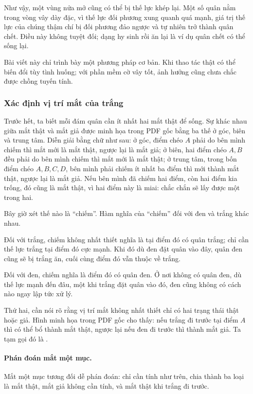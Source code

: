 \documentclass[11pt]{article}
\begin{document}
Như vậy, một vùng nửa mở cũng có thể bị thế lực khép lại. Một số quân nằm
trong vòng vây dày đặc, vì thế lực đối phương xung quanh quá mạnh, giá trị
thế lực của chúng thậm chí bị đối phương đảo ngược và tự nhiên trở thành
quân chết. Điều này không tuyệt đối; dạng hy sinh rồi ăn lại là ví dụ quân
chết có thể sống lại.

Bài viết này chỉ trình bày một phương pháp cơ bản. Khi thao tác thật có thể
biến đổi tùy tình huống; với phần mềm cờ vây tốt, ảnh hưởng cũng chưa chắc
được chồng tuyến tính.

\subsubsection{Xác định vị trí mắt của trắng}

Trước hết, ta biết mỗi đám quân cần ít nhất hai mắt thật để sống. Sự khác
nhau giữa mắt thật và mắt giả được minh họa trong PDF gốc bằng ba thế ở góc,
biên và trung tâm. Diễn giải bằng chữ như sau: ở góc, điểm chéo \(A\) phải
do bên mình chiếm thì mắt mới là mắt thật, ngược lại là mắt giả; ở biên, hai
điểm chéo \(A,B\) đều phải do bên mình chiếm thì mắt mới là mắt thật; ở trung
tâm, trong bốn điểm chéo \(A,B,C,D\), bên mình phải chiếm ít nhất ba điểm thì
mới thành mắt thật, ngược lại là mắt giả. Nếu bên mình đã chiếm hai điểm, còn
hai điểm kia trống, đó cũng là mắt thật, vì hai điểm này là miai: chắc chắn
sẽ lấy được một trong hai.

Bây giờ xét thế nào là ``chiếm''. Hàm nghĩa của ``chiếm'' đối với đen và
trắng khác nhau.

Đối với trắng, chiếm không nhất thiết nghĩa là tại điểm đó có quân trắng; chỉ
cần thế lực trắng tại điểm đó cực mạnh. Khi đó dù đen đặt quân vào đây, quân
đen cũng sẽ bị trắng ăn, cuối cùng điểm đó vẫn thuộc về trắng.

Đối với đen, chiếm nghĩa là điểm đó có quân đen. Ở nơi không có quân đen, dù
thế lực mạnh đến đâu, một khi trắng đặt quân vào đó, đen cũng không có cách
nào ngay lập tức xử lý.

Thứ hai, cần nói rõ rằng vị trí mắt không nhất thiết chỉ có hai trạng thái
thật hoặc giả. Hình minh họa trong PDF gốc cho thấy: nếu trắng đi trước tại
điểm \(A\) thì có thể bổ thành mắt thật, ngược lại nếu đen đi trước thì thành
mắt giả. Ta tạm gọi đó là .

\paragraph{Phán đoán mắt một mục.}
Mắt một mục tương đối dễ phán đoán: chỉ cần tính như trên, chia thành ba
loại là mắt thật, mắt giả không cần tính, và mắt thật khi trắng đi trước.
\end{document}
